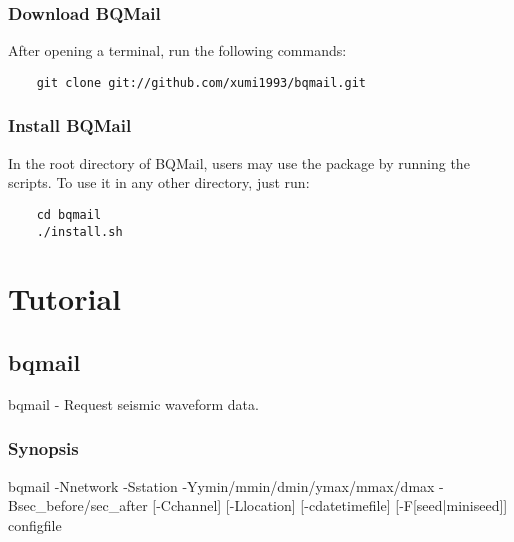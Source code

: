 \documentclass[12pt, a4paper]{report}
\begin{document}
\subsection{Download BQMail}
After opening a terminal, run the following commands:
\begin{lstlisting}
	git clone git://github.com/xumi1993/bqmail.git
\end{lstlisting}
\subsection{Install BQMail}
In the root directory of BQMail, users may use the package by running the scripts. To use it in any other directory, just run:
\begin{lstlisting}
	cd bqmail
	./install.sh
\end{lstlisting}

\chapter{Tutorial}
\section{bqmail}
bqmail - Request seismic waveform data.
\subsection{Synopsis}
{\tb bqmail} {\tb -N}{\ti network} {\tb -S}{\ti station} {\tb -Y}{\ti ymin/mmin/dmin/ymax/mmax/dmax} {\tb -B}{\ti sec\_before/sec\_after} [{\tb -C}{\ti channel}] [{\tb -L}{\ti location}] [{\tb -c}{\ti datetimefile}] [{\tb -F[{\ti seed}|{\ti miniseed}]}] {\ti configfile}
\end{document}
